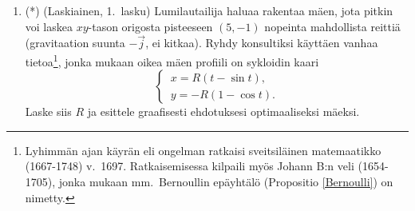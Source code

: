 \begin{enumerate}
\item (*) 
(Laskiainen, 1.\ lasku) Lumilautailija haluaa rakentaa mäen, jota pitkin voi laskea $xy$-tason
origosta pisteeseen $(5,-1)$ nopeinta mahdollista reittiä (gravitaation suunta $-\vec j$, ei
kitkaa). Ryhdy konsultiksi käyttäen vanhaa tietoa\footnote[2]{Lyhimmän ajan käyrän eli
 ongelman ratkaisi sveitsiläinen matemaatikko 
(1667-1748) v.\ 1697. Ratkaisemisessa kilpaili myös Johann B:n veli  (1654-1705),
jonka mukaan mm.\ Bernoullin epäyhtälö (Propositio \ref{Bernoulli}) on nimetty.
  },
jonka mukaan oikea mäen profiili on sykloidin kaari
\[
\begin{cases} \,x=R(t-\sin t), \\ \,y=-R(1-\cos t). \end{cases}
\]
Laske siis $R$ ja esittele graafisesti ehdotuksesi optimaaliseksi mäeksi.

\end{enumerate}